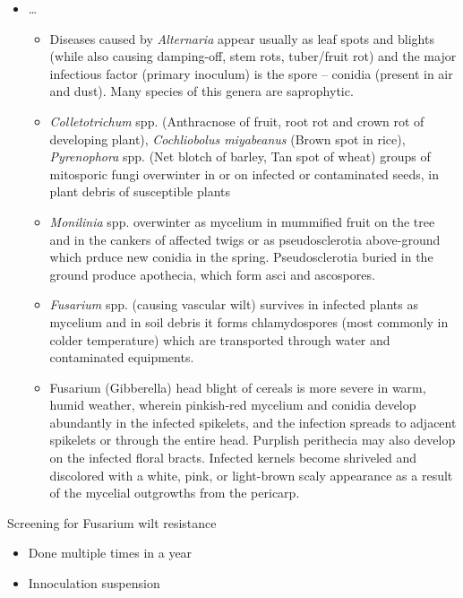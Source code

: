 \documentclass[11pt,dvipsnames,ignorenonframetext,aspectratio=169]{beamer}
\providecommand{\tightlist}{%
  \setlength{\itemsep}{0pt}\setlength{\parskip}{0pt}}
\begin{document}
\begin{frame}{}
\protect\hypertarget{section-4}{}
\small

\begin{itemize}
\tightlist
\item
  \ldots{}

  \begin{itemize}
  \footnotesize
  \item Diseases caused by \textit{Alternaria} appear usually as leaf spots and blights (while also causing damping-off, stem rots, tuber/fruit rot) and the major infectious factor (primary inoculum) is the spore -- conidia (present in air and dust). Many species of this genera are saprophytic.
  \item \textit{Colletotrichum} spp. (Anthracnose of fruit, root rot and crown rot of developing plant), \textit{Cochliobolus miyabeanus} (Brown spot in rice), \textit{Pyrenophora} spp. (Net blotch of barley, Tan spot of wheat) groups of mitosporic fungi overwinter in or on infected or contaminated seeds, in plant debris of susceptible plants
  \item \textit{Monilinia} spp. overwinter as mycelium in mummified fruit on the tree and in the cankers of affected twigs or as pseudosclerotia above-ground which prduce new conidia in the spring. Pseudosclerotia buried in the ground produce apothecia, which form asci and ascospores.
  \item \textit{Fusarium} spp. (causing vascular wilt) survives in infected plants as mycelium and in soil debris it forms chlamydospores (most commonly in colder temperature) which are transported through water and contaminated equipments.
  \item Fusarium (Gibberella) head blight of cereals is more severe in warm, humid weather, wherein pinkish-red mycelium and conidia develop abundantly in the infected spikelets, and the infection spreads to adjacent spikelets or through the entire head. Purplish perithecia may also develop on the infected floral bracts. Infected kernels become shriveled and discolored with a white, pink, or light-brown scaly appearance as a result of the mycelial outgrowths from the pericarp.
  \end{itemize}
\end{itemize}
\end{frame}

\begin{frame}{Screening for Fusarium wilt resistance}
\protect\hypertarget{screening-for-fusarium-wilt-resistance}{}
\begin{itemize}
\tightlist
\item
  Done multiple times in a year
\item
  Innoculation suspension
\end{itemize}
\end{frame}
\end{document}
